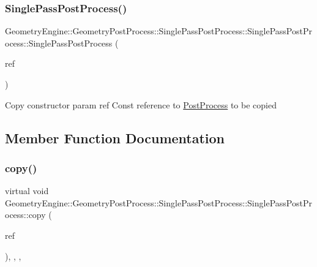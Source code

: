 \subsubsection{\texorpdfstring{SinglePassPostProcess()}{SinglePassPostProcess()}\hspace{0.1cm}{\footnotesize\ttfamily [2/2]}}
{\footnotesize\ttfamily Geometry\+Engine\+::\+Geometry\+Post\+Process\+::\+Single\+Pass\+Post\+Process\+::\+Single\+Pass\+Post\+Process\+::\+Single\+Pass\+Post\+Process (\begin{DoxyParamCaption}\item[{const \mbox{\hyperlink{class_geometry_engine_1_1_geometry_post_process_1_1_single_pass_post_process_1_1_single_pass_post_process}{Single\+Pass\+Post\+Process}} \&}]{ref }\end{DoxyParamCaption})\hspace{0.3cm}{\ttfamily [inline]}}

Copy constructor param ref Const reference to \mbox{\hyperlink{class_geometry_engine_1_1_geometry_post_process_1_1_post_process}{Post\+Process}} to be copied 

\subsection{Member Function Documentation}
\mbox{\label{class_geometry_engine_1_1_geometry_post_process_1_1_single_pass_post_process_1_1_single_pass_post_process_ab47b36f68057dcff05402a9e5a630878}} 
\subsubsection{\texorpdfstring{copy()}{copy()}}
{\footnotesize\ttfamily virtual void Geometry\+Engine\+::\+Geometry\+Post\+Process\+::\+Single\+Pass\+Post\+Process\+::\+Single\+Pass\+Post\+Process\+::copy (\begin{DoxyParamCaption}\item[{const \mbox{\hyperlink{class_geometry_engine_1_1_geometry_post_process_1_1_post_process}{Post\+Process}} \&}]{ref }\end{DoxyParamCaption})\hspace{0.3cm}{\ttfamily [inline]}, {\ttfamily [override]}, {\ttfamily [protected]}, {\ttfamily [virtual]}}

